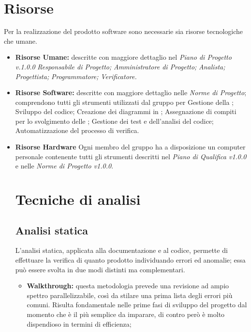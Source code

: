 \section{Risorse} Per la realizzazione del prodotto software sono necessarie sia risorse tecnologiche che umane.
\begin{itemize}
	\item \textbf{Risorse Umane:} descritte con maggiore dettaglio nel \textit{Piano di Progetto v.1.0.0}
	\subitem	\textit{Responsabile di Progetto;}
	\subitem	\textit{Amministratore di Progetto;}
	\subitem	\textit{Analista;}
	\subitem	\textit{Progettista;}
	\subitem	\textit{Programmatore;}
	\subitem	\textit{Verificatore.}
	
	\item \textbf{Risorse Software:} descritte con maggiore dettaglio nelle \textit{Norme di Progetto}; comprendono tutti gli strumenti utilizzati dal gruppo per
	\subitem Gestione della ;
	\subitem Sviluppo del codice;
	\subitem Creazione dei diagrammi in ;
	\subitem Assegnazione di compiti per lo svolgimento delle ;
	\subitem Gestione dei test e dell'analisi del codice;
	\subitem Automatizzazione del processo di verifica.

	\item \textbf{Risorse Hardware}
	Ogni membro del gruppo ha a disposizione un computer personale contenente tutti gli strumenti descritti nel \textit{Piano di Qualifica v1.0.0} e nelle 
	\textit{Norme di Progetto v1.0.0}.
	
\section{Tecniche di analisi}
\subsection{Analisi statica} \label{AnalisiStatica}
L’analisi statica, applicata alla documentazione e al
codice, permette di effettuare la verifica di quanto prodotto individuando errori ed
anomalie; essa può essere svolta in due modi distinti ma complementari.

\begin{itemize}
\item \textbf{Walkthrough:} questa metodologia prevede una revisione ad ampio
spettro parallelizzabile, così da stilare una prima lista degli errori più
comuni. Risulta fondamentale nelle prime fasi di sviluppo del progetto
dal momento che è il più semplice da imparare, di contro però è molto
dispendioso in termini di efficienza;


\end{itemize}
\end{itemize}
